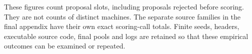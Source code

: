 These figures count proposal slots, including proposals rejected before
scoring. They are not counts of distinct machines. The separate source
families in the final appendix have their own exact scoring-call totals.
Finite seeds, headers, executable source code, final pools and logs are
retained so that these empirical outcomes can be examined or repeated.
